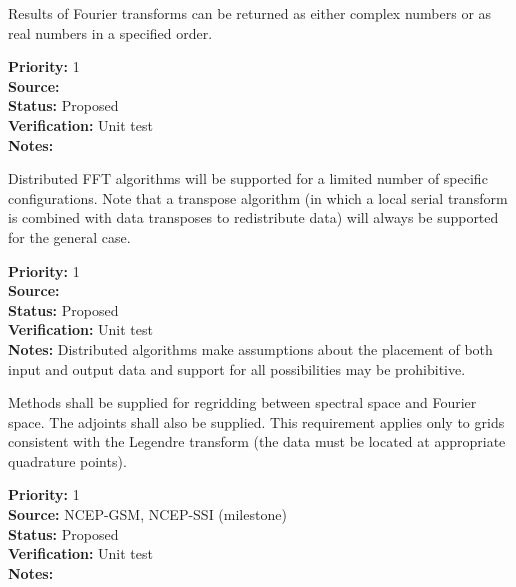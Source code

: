 
Results of Fourier transforms can be returned as either
complex numbers or as real numbers in a specified order.

\begin{reqlist}
{\bf Priority:} 1 \\
{\bf Source:}  \\
{\bf Status:} Proposed \\
{\bf Verification:} Unit test \\
{\bf Notes:} 
\end{reqlist}


Distributed FFT algorithms will be supported for a limited
number of specific configurations.  Note that a transpose
algorithm (in which a local serial transform is combined
with data transposes to redistribute data) will always
be supported for the general case.

\begin{reqlist}
{\bf Priority:} 1 \\
{\bf Source:}  \\
{\bf Status:} Proposed \\
{\bf Verification:} Unit test \\
{\bf Notes:} Distributed algorithms make assumptions about
             the placement of both input and output data and
             support for all possibilities may be prohibitive.
\end{reqlist}


Methods shall be supplied for regridding between spectral space and
Fourier space.  The adjoints shall also be supplied.  This requirement
applies only to grids consistent with the Legendre transform (the
data must be located at appropriate quadrature points).

\begin{reqlist}
{\bf Priority:} 1 \\
{\bf Source:}  NCEP-GSM, NCEP-SSI (milestone) \\
{\bf Status:} Proposed \\
{\bf Verification:} Unit test \\
{\bf Notes:}
\end{reqlist}


